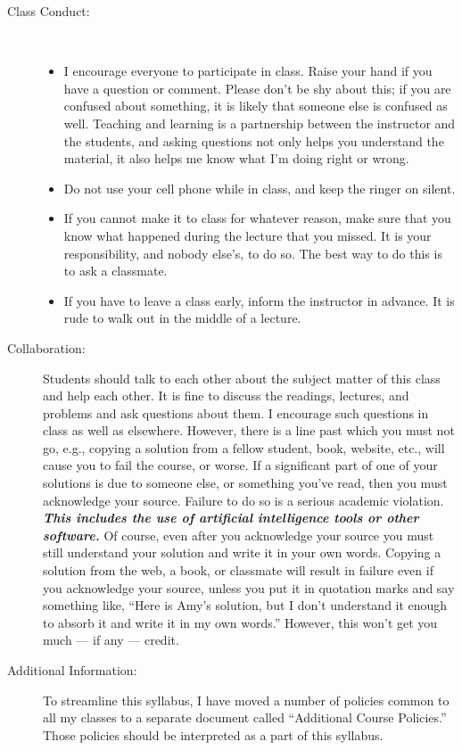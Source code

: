 \documentclass [letterpaper,10pt]{article}
\begin{document}
\begin{description}
\item[Class Conduct:] \
   \begin{itemize}\setlength{\itemsep}{0em}\setlength{\parskip}{0pt}
   	\item I encourage everyone to participate in class.  Raise your hand if you have
	a question or comment.  Please don't be shy about this; if you are confused about
	something, it is likely that someone else is confused as well.
		Teaching and learning is a partnership between the instructor and the students, and asking questions not only helps you understand the material, it also
		helps me know what I'm doing right or wrong.
			     \item Do not use your cell phone while in class, and 
			     keep the ringer on silent.
     \item  If you cannot make it to class for whatever reason, make sure that
       you know what happened during the lecture that you missed. It is
       your responsibility, and nobody else's, to do so.  The best way to do this is
       to ask a classmate.  
     \item  If you have to leave a class early, inform the instructor in
       advance. It is rude to walk out in the middle of a
       lecture. 
     \end{itemize}
     
\item[Collaboration:]
Students should talk to each other about the subject matter of this class and help each other.  It is fine to discuss the readings, lectures, and problems and ask questions about them. I encourage such questions in class as well as elsewhere. However, there is a line past which you must not go, e.g., copying a solution from a fellow student, book, website, etc., will cause you to fail the course, or worse. If a significant part of one of your solutions is due to someone else, or something you've read, then you must acknowledge your source. Failure to do so is a serious academic violation.  \emph{\textbf{ This includes the use of artificial
intelligence tools or other software.}} Of course, even after you acknowledge your source you must still understand your solution and write it in your own words. Copying a solution from the web, a book, or classmate will result in failure even if you acknowledge your source, unless you put it in quotation marks and say something like, ``Here is Amy's solution, but I don't understand it enough to absorb it and write it in my own words.'' However, this won't get you much --- if any --- credit. 


\item[Additional Information:] To streamline this syllabus, I have moved a number of policies
common to all my classes to a separate document called ``Additional Course Policies.'' 
Those policies should be interpreted as a part of this syllabus.


\end{description}
   
\end{document}
